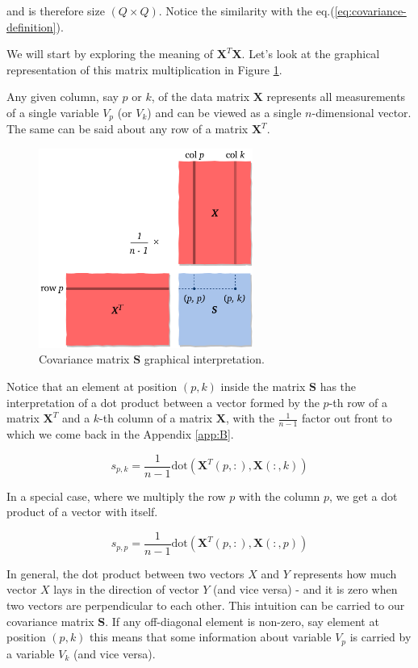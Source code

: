 \documentclass[10pt,twocolumn]{article}
\begin{document}
and is therefore size $(Q \times Q)$. Notice the similarity with the eq.(\ref{eq:covariance-definition}).

We will start by exploring the meaning of $\bm{X}^T \bm{X}$. Let's look at the graphical representation of this matrix multiplication in Figure \ref{fig:covariance-matrix}.

Any given column, say $p$ or $k$, of the data matrix $\bm{X}$ represents all measurements of a single variable $V_p$ (or $V_k$) and can be viewed as a single $n$-dimensional vector. The same can be said about any row of a matrix $\bm{X}^T$.

\begin{figure}[H]
\centering\includegraphics[width=7cm]{cov-matrix.png}
\caption{Covariance matrix $\bm{S}$ graphical interpretation.}
\label{fig:covariance-matrix}
\end{figure}

Notice that an element at position $(p,k)$ inside the matrix $\bm{S}$ has the interpretation of a dot product between a vector formed by the $p$-th row of a matrix $\bm{X}^T$ and a $k$-th column of a matrix $\bm{X}$, with the $\frac{1}{n-1}$ factor out front to which we come back in the Appendix \ref{app:B}.

\begin{equation}
s_{p,k} = \frac{1}{n-1} \text{dot}( \bm{X}^T(p, :), \bm{X}(:,k))
\end{equation}

In a special case, where we multiply the row $p$ with the column $p$, we get a dot product of a vector with itself.

\begin{equation}
s_{p,p} = \frac{1}{n-1} \text{dot}( \bm{X}^T(p, :), \bm{X}(:,p))
\end{equation}

In general, the dot product between two vectors $X$ and $Y$ represents how much vector $X$ lays in the direction of vector $Y$ (and vice versa) - and it is zero when two vectors are perpendicular to each other. This intuition can be carried to our covariance matrix $\bm{S}$. If any off-diagonal element is non-zero, say element at position $(p,k)$ this means that some information about variable $V_p$ is carried by a variable $V_k$ (and vice versa).
\end{document}
